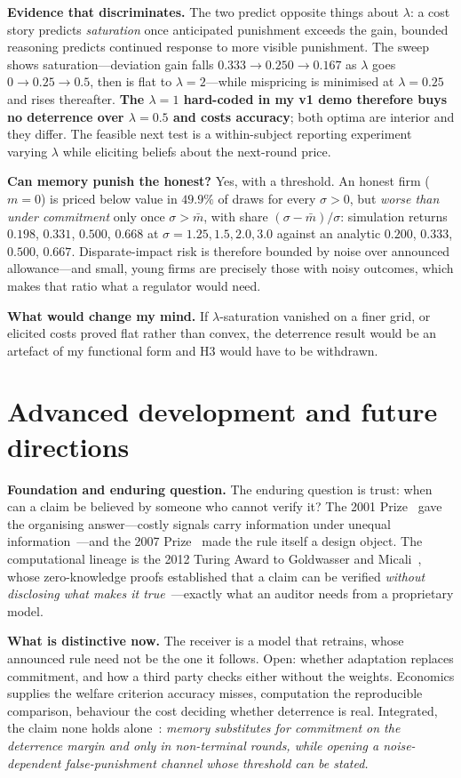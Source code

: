 \textbf{Evidence that discriminates.} The two predict opposite things about
$\lambda$: a cost story predicts \emph{saturation} once anticipated punishment
exceeds the gain, bounded reasoning predicts continued response to more visible
punishment. The sweep shows saturation---deviation gain falls
$0.333\to0.250\to0.167$ as $\lambda$ goes $0\to0.25\to0.5$, then is flat to
$\lambda=2$---while mispricing is minimised at $\lambda=0.25$ and rises
thereafter. \textbf{The $\lambda=1$ hard-coded in my v1 demo therefore buys no
deterrence over $\lambda=0.5$ and costs accuracy}; both optima are interior and
they differ. The feasible next test is a within-subject reporting experiment
varying $\lambda$ while eliciting beliefs about the next-round price.

\textbf{Can memory punish the honest?} Yes, with a threshold. An honest firm
($m=0$) is priced below value in $49.9\%$ of draws for every $\sigma>0$, but
\emph{worse than under commitment} only once $\sigma>\bar m$, with share
$(\sigma-\bar m)/\sigma$: simulation returns $0.198$, $0.331$, $0.500$, $0.668$
at $\sigma=1.25,1.5,2.0,3.0$ against an analytic $0.200$, $0.333$, $0.500$,
$0.667$. Disparate-impact risk is therefore bounded by noise over announced
allowance---and small, young firms are precisely those with noisy outcomes,
which makes that ratio what a regulator would need.

\textbf{What would change my mind.} If $\lambda$-saturation vanished on a finer
grid, or elicited costs proved flat rather than convex, the deterrence result
would be an artefact of my functional form and H3 would have to be withdrawn.

\section{Advanced development and future directions}
\textbf{Foundation and enduring question.} The enduring question is trust: when
can a claim be believed by someone who cannot verify it? The 2001
Prize~\cite{nobel2001} gave the organising answer---costly signals carry
information under unequal information~\cite{spence1973}---and the 2007
Prize~\cite{nobel2007} made the rule itself a design object. The computational
lineage is the 2012 Turing Award to Goldwasser and Micali~\cite{turing2012},
whose zero-knowledge proofs established that a claim can be verified
\emph{without disclosing what makes it true}~\cite{goldwasser1989}---exactly
what an auditor needs from a proprietary model.

\textbf{What is distinctive now.} The receiver is a model that retrains, whose
announced rule need not be the one it follows. Open: whether adaptation replaces
commitment, and how a third party checks either without the weights. Economics
supplies the welfare criterion accuracy misses, computation the reproducible
comparison, behaviour the cost deciding whether deterrence is real. Integrated,
the claim none holds alone~\cite{osullivan2025}:
\emph{memory substitutes for commitment on the deterrence margin and only in
non-terminal rounds, while opening a noise-dependent false-punishment channel
whose threshold can be stated.}

